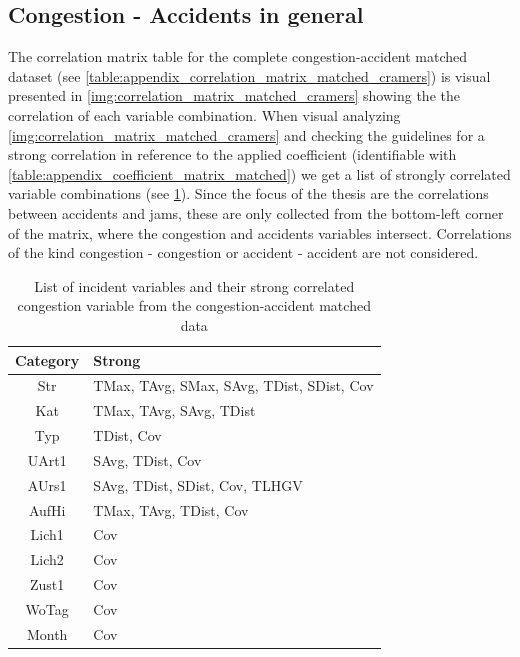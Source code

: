 \subsection{Congestion - Accidents in general}
\label{analysis_processing_correlation_baysis_matched}
The correlation matrix table for the complete congestion-accident matched dataset (see \cref{table:appendix_correlation_matrix_matched_cramers}) is visual presented in \cref{img:correlation_matrix_matched_cramers} showing the the correlation of each variable combination. When visual analyzing \cref{img:correlation_matrix_matched_cramers} and checking the guidelines for a strong correlation in reference to the applied coefficient (identifiable with \cref{table:appendix_coefficient_matrix_matched}) we get a list of strongly correlated variable combinations (see \cref{tbl:correlation_list_baysis_matched}). Since the focus of the thesis are the correlations between accidents and jams, these are only collected from the bottom-left corner of the matrix, where the congestion and accidents variables intersect. Correlations of the kind congestion - congestion or accident - accident are not considered.
\begin{table}[ht!]
	\centering
	\begin{tabular}{c|l}  
		\toprule
		Category & Strong \\
		\midrule
		Str & TMax, TAvg, SMax, SAvg, TDist, SDist, Cov \\ 
 		Kat & TMax, TAvg, SAvg, TDist \\
 		Typ & TDist, Cov \\
 		UArt1 & SAvg, TDist, Cov \\ %
 		AUrs1 & SAvg, TDist, SDist, Cov, TLHGV \\ %
 		AufHi & TMax, TAvg, TDist, Cov \\
 		Lich1 & Cov \\
 		Lich2 & Cov \\ %
 		Zust1 & Cov \\ %
 		WoTag & Cov \\
		Month & Cov \\ %
		\bottomrule
	\end{tabular}
	\caption{List of incident variables and their strong correlated congestion variable from the congestion-accident matched data}
	\label{tbl:correlation_list_baysis_matched}
\end{table}
